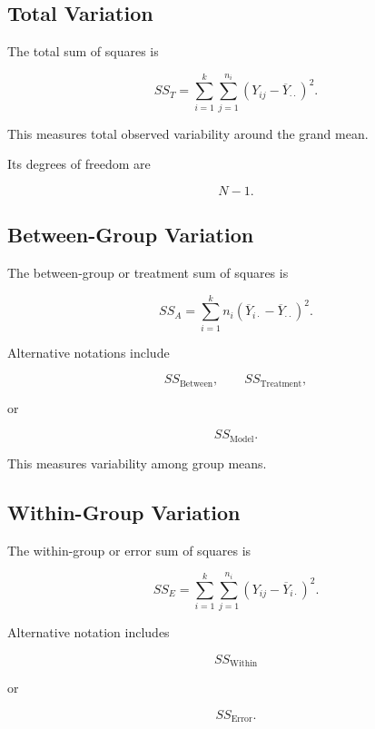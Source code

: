 \subsection{Total Variation}
\label{subsec:anova-total-variation}

The total sum of squares is

\[
\boxed{
SS_T
=
\sum_{i=1}^{k}
\sum_{j=1}^{n_i}
\left(
Y_{ij}
-
\overline{Y}_{\cdot\cdot}
\right)^2.
}
\]

This measures total observed variability around the grand mean.

Its degrees of freedom are

\[
\boxed{
N-1.
}
\]

\subsection{Between-Group Variation}
\label{subsec:between-group-variation}

The between-group or treatment sum of squares is

\[
\boxed{
SS_A
=
\sum_{i=1}^{k}
n_i
\left(
\overline{Y}_{i\cdot}
-
\overline{Y}_{\cdot\cdot}
\right)^2.
}
\]

Alternative notations include

\[
SS_{\text{Between}},
\qquad
SS_{\text{Treatment}},
\]

or

\[
SS_{\text{Model}}.
\]

This measures variability among group means.

\subsection{Within-Group Variation}
\label{subsec:within-group-variation}

The within-group or error sum of squares is

\[
\boxed{
SS_E
=
\sum_{i=1}^{k}
\sum_{j=1}^{n_i}
\left(
Y_{ij}
-
\overline{Y}_{i\cdot}
\right)^2.
}
\]

Alternative notation includes

\[
SS_{\text{Within}}
\]

or

\[
SS_{\text{Error}}.
\]

